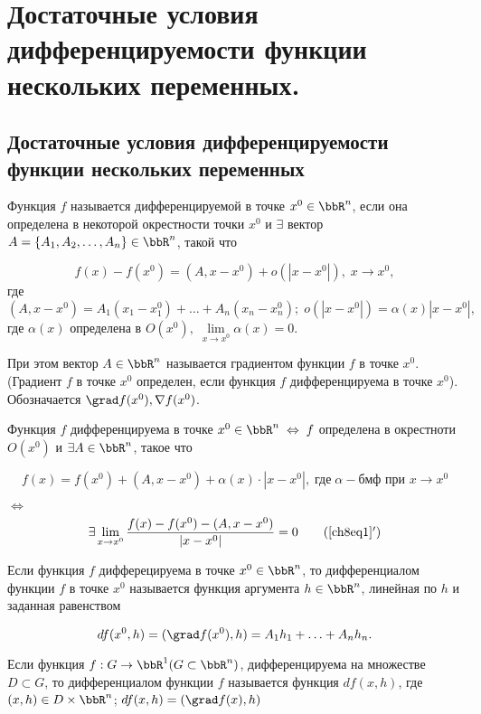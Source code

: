 \chapter[\texorpdfstring{Достаточные условия дифференцируемости функции не\-скольких переменных.}{}]{Достаточные условия дифференцируемости функции нескольких переменных.}
\section[\texorpdfstring{Достаточные условия дифференцируемости функции \\несколь\-ких переменных.}{}]{Достаточные условия дифференцируемости функции нескольких переменных}

\begin{defn}
Функция $f$ называется дифференцируемой в точке $x^0 \in \bbR^n$, если она определена в некоторой окрестности точки $x^0$ и $\exists$ вектор $A = \{ A_1, A_2, \ldots , A_n\} \in \bbR^n$, такой что 

\begin{equation} \label{ch8eq1}
f(x) - f(x^0) = (A, x - x^0) + o(|x - x^0|), \; x \to x^0, 
\end{equation}
где $(A, x - x^0) = A_1(x_1 - x^0_1) + \ldots + A_n(x_n - x^0_n); \; o(|x - x^0|) = \alpha(x)|x - x^0|,$ где $\alpha(x)$ определена в $O(x^0), \; \lim\limits_{x \to x^0} \alpha(x) = 0$.

При этом вектор $A \in \bbR^n$ называется градиентом функции $f$ в точке $x^0$. (Градиент $f$ в точке $x^0$ определен, если функция $f$ дифференцируема в точке $x^0$). Обозначается $\grad f(x^0), \nabla f(x^0)$.

Функция $f$ дифференцируема в точке $x^0 \in \bbR^n \; \Leftrightarrow \; f$ определена в окрестноти $O(x^0)$ и $\exists A \in \bbR^n$, такое что 

$$
f(x) = f(x^0) + (A, x - x^0) + \alpha(x) \cdot |x - x^0|, \; \textit{где} \; \alpha - \textit{бмф при } x \to x^0 
$$ 

$\Leftrightarrow \;$
\begin{equation} \label{ch8eq1'}
\exists \lim\limits_{x \to x^0} \frac{f(x) - f(x^0) - (A, x - x^0)}{|x - x^0|} = 0
\tag{\ref{ch8eq1}$'$}
\end{equation}

\end{defn}

\begin{defn}
Если функция $f$ дифферецируема в точке $x^0 \in \bbR^n$, то дифференциалом функции $f$ в точке $x^0$ называется функция аргумента $h \in \bbR^n$, линейная  по $h$ и заданная равенством

$$
df(x^0, h) = (\grad f(x^0), h) = A_1 h_1 + \ldots + A_n h_n.
$$

Если функция $f: G \to \bbR^1 (G \subset \bbR^n)$, дифференцируема на множестве $D \subset G$, то дифференциалом функции $f$ называется функция $df(x,h)$, где $(x,h) \in D \times \bbR^n$; $df(x,h) = (\grad f(x), h)$
\end{defn}

